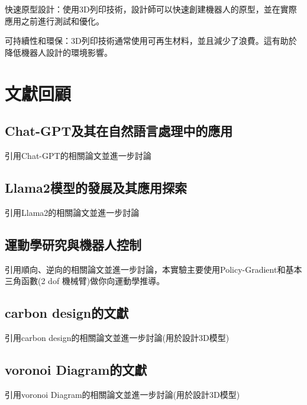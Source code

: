 \documentclass[class=NCU_thesis, crop=false]{standalone}
\begin{document}
快速原型設計：使用3D列印技術，設計師可以快速創建機器人的原型，並在實際應用之前進行測試和優化。

可持續性和環保：3D列印技術通常使用可再生材料，並且減少了浪費。這有助於降低機器人設計的環境影響。

\section{文獻回顧}
\subsection{Chat-GPT及其在自然語言處理中的應用}
引用Chat-GPT的相關論文並進一步討論

\subsection{Llama2模型的發展及其應用探索}
引用Llama2的相關論文並進一步討論

\subsection{運動學研究與機器人控制}
引用順向、逆向的相關論文並進一步討論，本實驗主要使用Policy-Gradient和基本三角函數(2 dof 機械臂)做你向運動學推導。

\subsection{carbon design的文獻}
引用carbon design的相關論文並進一步討論(用於設計3D模型)

\subsection{voronoi Diagram的文獻}
引用voronoi Diagram的相關論文並進一步討論(用於設計3D模型)
\end{document}
